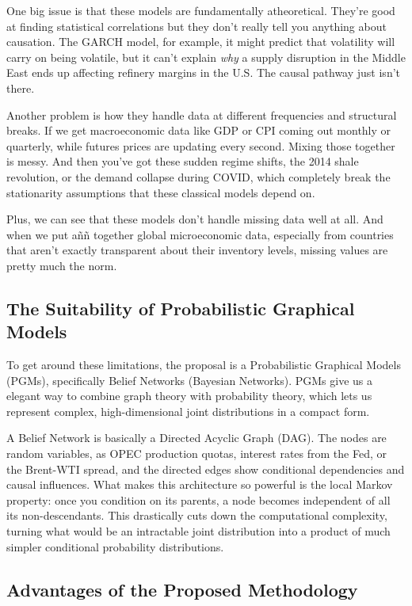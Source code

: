 \documentclass[11pt,a4paper]{article}
\begin{document}
One big issue is that these models are fundamentally atheoretical. They're 
good at finding statistical correlations but they don't really tell you anything 
about causation. The GARCH model, for example, it might predict that volatility 
will carry on being volatile, but it can't explain \textit{why} a supply 
disruption in the Middle East ends up affecting refinery margins in the U.S. 
The causal pathway just isn't there.

Another problem is how they handle data at different frequencies and 
structural breaks. If we get macroeconomic data like GDP or CPI coming out monthly 
or quarterly, while futures prices are updating every second. Mixing those 
together is messy. And then you've got these sudden regime shifts, the 2014 shale 
revolution, or the demand collapse during COVID, which completely break the 
stationarity assumptions that these classical models depend on.

Plus, we can see that these models don't handle missing data well at all. 
And when we put aññ together global microeconomic data, especially from countries 
that aren't exactly transparent about their inventory levels, missing values are 
pretty much the norm.

\subsection{The Suitability of Probabilistic Graphical Models}

To get around these limitations, the proposal is a Probabilistic Graphical Models (PGMs), 
specifically Belief Networks (Bayesian Networks). PGMs give us a elegant way to combine 
graph theory with probability theory, which lets us represent complex, 
high-dimensional joint distributions in a compact form.

A Belief Network is basically a Directed Acyclic Graph (DAG). The nodes are 
 random variables, as OPEC production quotas, interest rates from the Fed, 
 or the Brent-WTI spread, and the directed edges show conditional dependencies 
 and causal influences. What makes this architecture so powerful is the local 
 Markov property: once you condition on its parents, a node becomes independent 
 of all its non-descendants. This drastically cuts down the computational complexity, 
 turning what would be an intractable joint distribution into a product of much 
 simpler conditional probability distributions.

\subsection{Advantages of the Proposed Methodology}
\end{document}
